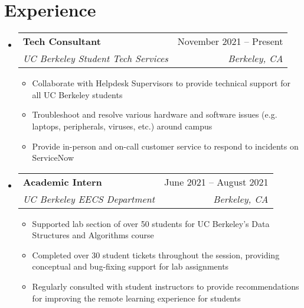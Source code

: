\documentclass[letterpaper,11pt]{article}
\makeatletter
\newcommand{\resumeItem}[1]{
  \item\small{
    {#1 \vspace{-2pt}}
  }
}
\newcommand{\resumeSubheading}[4]{
  \vspace{-2pt}\item
    \begin{tabular*}{0.97\textwidth}[t]{l@{\extracolsep{\fill}}r}
      \textbf{#1} & #2 \\
      \textit{\small#3} & \textit{\small #4} \\
    \end{tabular*}\vspace{-7pt}
}
\newcommand{\resumeSubSubheading}[2]{
    \item
    \begin{tabular*}{0.97\textwidth}{l@{\extracolsep{\fill}}r}
      \textit{\small#1} & \textit{\small #2} \\
    \end{tabular*}\vspace{-7pt}
}
\newcommand{\resumeSubHeadingListStart}{\begin{itemize}[leftmargin=0.15in, label={}]}
\newcommand{\resumeSubHeadingListEnd}{\end{itemize}}
\newcommand{\resumeItemListStart}{\begin{itemize}}
\newcommand{\resumeItemListEnd}{\end{itemize}\vspace{-5pt}}
\makeatother
\begin{document}
\section{Experience}
  \resumeSubHeadingListStart

    \resumeSubheading
      {Tech Consultant}{November 2021 -- Present}
      {UC Berkeley Student Tech Services}{Berkeley, CA}
      \resumeItemListStart
        \resumeItem{Collaborate with Helpdesk Supervisors to provide technical support for all UC Berkeley students}
        \resumeItem{Troubleshoot and resolve various hardware and software issues (e.g. laptops, peripherals, viruses, etc.) around campus}
        \resumeItem{Provide in-person and on-call customer service to respond to incidents on ServiceNow}
      \resumeItemListEnd
      

    \resumeSubheading
      {Academic Intern}{June 2021 -- August 2021}
      {UC Berkeley EECS Department}{Berkeley, CA}
      \resumeItemListStart
        \resumeItem{Supported lab section of over 50 students for UC Berkeley’s Data Structures and Algorithms course}
        \resumeItem{Completed over 30 student tickets throughout the session, providing conceptual and bug-fixing support for lab assignments}
        \resumeItem{Regularly consulted with student instructors to provide recommendations for improving the remote learning experience for students}
    \resumeItemListEnd

  \resumeSubHeadingListEnd


\end{document}
